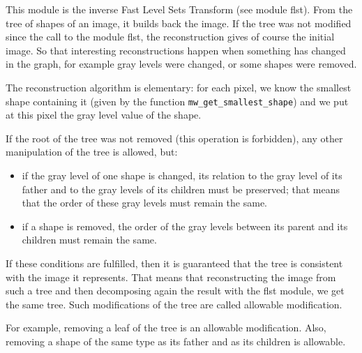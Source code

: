 This module is the inverse Fast Level Sets Transform (see module flst). From
the tree of shapes of an image, it builds back the image. If the tree was not
modified since the call to the module flst, the reconstruction gives of course
the initial image. So that interesting reconstructions happen when something
has changed in the graph, for example gray levels were changed, or some shapes
were removed.

The reconstruction algorithm is elementary: for each pixel, we know the
smallest shape containing it (given by the function
\texttt{mw\_get\_smallest\_shape}) and we put at this pixel the gray level value
of the shape.

If the root of the tree was not removed (this operation is forbidden), any
other manipulation of the tree is allowed, but:
\begin{itemize}
\item if the gray level of one shape is changed, its relation to the gray
level of its father and to the gray levels of its children must be preserved;
that means that the order of these gray levels must remain the same.
\item if a shape is removed, the order of the gray levels between its parent
and its children must remain the same.
\end{itemize}
If these conditions are fulfilled, then it is guaranteed that the tree is
consistent with the image it represents. That means that reconstructing the
image from such a tree and then decomposing again the result with the flst
module, we get the same tree. Such modifications of the tree are called
allowable modification.

For example, removing a leaf of the tree is an allowable modification. Also,
removing a shape of the same type as its father and as its children is
allowable.
